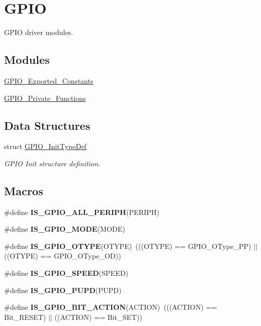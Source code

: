 \hypertarget{group___g_p_i_o}{\section{G\-P\-I\-O}
\label{group___g_p_i_o}
}


G\-P\-I\-O driver modules.  


\subsection*{Modules}
\begin{DoxyCompactItemize}
\item 
\hyperlink{group___g_p_i_o___exported___constants}{G\-P\-I\-O\-\_\-\-Exported\-\_\-\-Constants}
\item 
\hyperlink{group___g_p_i_o___private___functions}{G\-P\-I\-O\-\_\-\-Private\-\_\-\-Functions}
\end{DoxyCompactItemize}
\subsection*{Data Structures}
\begin{DoxyCompactItemize}
\item 
struct \hyperlink{struct_g_p_i_o___init_type_def}{G\-P\-I\-O\-\_\-\-Init\-Type\-Def}
\begin{DoxyCompactList}\small\item\em G\-P\-I\-O Init structure definition. \end{DoxyCompactList}\end{DoxyCompactItemize}
\subsection*{Macros}
\begin{DoxyCompactItemize}
\item 
\#define {\bfseries I\-S\-\_\-\-G\-P\-I\-O\-\_\-\-A\-L\-L\-\_\-\-P\-E\-R\-I\-P\-H}(P\-E\-R\-I\-P\-H)
\item 
\#define {\bfseries I\-S\-\_\-\-G\-P\-I\-O\-\_\-\-M\-O\-D\-E}(M\-O\-D\-E)
\item 
\hypertarget{group___g_p_i_o_ga7145550a414f2b0455d79ddde6100af8}{\#define {\bfseries I\-S\-\_\-\-G\-P\-I\-O\-\_\-\-O\-T\-Y\-P\-E}(O\-T\-Y\-P\-E)~(((O\-T\-Y\-P\-E) == G\-P\-I\-O\-\_\-\-O\-Type\-\_\-\-P\-P) $|$$|$ ((O\-T\-Y\-P\-E) == G\-P\-I\-O\-\_\-\-O\-Type\-\_\-\-O\-D))}\label{group___g_p_i_o_ga7145550a414f2b0455d79ddde6100af8}

\item 
\#define {\bfseries I\-S\-\_\-\-G\-P\-I\-O\-\_\-\-S\-P\-E\-E\-D}(S\-P\-E\-E\-D)
\item 
\#define {\bfseries I\-S\-\_\-\-G\-P\-I\-O\-\_\-\-P\-U\-P\-D}(P\-U\-P\-D)
\item 
\hypertarget{group___g_p_i_o_ga6b882caa8ed9857c5c7267959a7818c5}{\#define {\bfseries I\-S\-\_\-\-G\-P\-I\-O\-\_\-\-B\-I\-T\-\_\-\-A\-C\-T\-I\-O\-N}(A\-C\-T\-I\-O\-N)~(((A\-C\-T\-I\-O\-N) == Bit\-\_\-\-R\-E\-S\-E\-T) $|$$|$ ((A\-C\-T\-I\-O\-N) == Bit\-\_\-\-S\-E\-T))}\label{group___g_p_i_o_ga6b882caa8ed9857c5c7267959a7818c5}

\end{DoxyCompactItemize}
